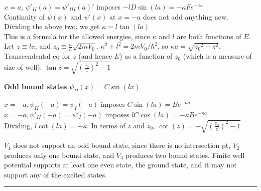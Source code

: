 $x = a$, $\psi'_{II}(a) = \psi'_{III}(a)'$ imposes $-lD \sin(la) = -\kappa F e^{-\kappa a}$ \\

Continuity of $\psi(x)$ and $\psi'(x)$ at $x = -a$ does not add anything new. \\

Dividing the above two, we get $\kappa = l \tan(la)$ \\
This is a formula for the allowed energies, since $\kappa$ and $l$ are both functions of $E$. Let $z \equiv la$, and $z_0 \equiv \frac{a}{\hbar} \sqrt{2m V_0}$. $\kappa^2 + l^2 = 2m V_0 / \hbar^2$, so $\kappa a = \sqrt{{z_0}^2 - z^2}$. \\

Transcendental eq for $z$ (and hence $E$) as a function of $z_0$ (which is a measure of size of well): $\tan z = \sqrt{(\frac{z_0}{z})^2 - 1}$

\textbf{Odd bound states}
$\psi_{II}(x) = C \sin(lx)$

$x = -a, \psi_{II}(-a) = \psi_{I}(-a)$ imposes $C \sin(la) = B e^{-\kappa a}$ \\
$x = -a, \psi'_{II}(-a) = \psi'_{I}(-a)$ imposes $l C \cos(la) = -\kappa B e^{-\kappa a}$ \\

Dividing, $l \cot(la) = -\kappa$. 
In terms of $z$ and $z_0$, $\cot(z) = - \sqrt{(\frac{z_0}{z})^2 - 1}$

$V_{1}$ does not support an odd bound state, since there is no intersection pt, $V_{2}$ produces only one bound state, and $V_{3}$ produces two bound states. Finite well potential supports at least one even state, the ground state, and it may not support any of the excited states.



\hrule height 0.3pt \thinspace

